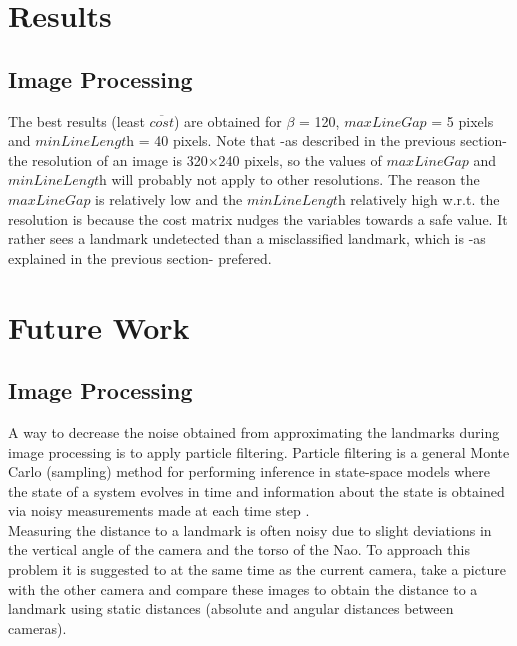 \documentclass{ba-kecs}
\numberwithin{figure}{section}
\numberwithin{equation}{section}
\begin{document}

\section{Results}

\subsection{Image Processing}
The best results (least $\overline{\textit{cost}}$) are obtained for $\beta$ = 120,  $\textit{maxLineGap}$ = 5 pixels and $\textit{minLineLength}$ = 40 pixels. Note that -as described in the previous section- the resolution of an image is 320$\times$240 pixels, so the values of $\textit{maxLineGap}$ and $\textit{minLineLength}$ will probably not apply to other resolutions.
The reason the $\textit{maxLineGap}$ is relatively low and the $\textit{minLineLength}$ relatively high w.r.t. the resolution is because the cost matrix nudges the variables towards a safe value. It rather sees a landmark undetected than a misclassified landmark, which is -as explained in the previous section- prefered.



\section{Future Work}

\subsection{Image Processing}
	A way to decrease the noise obtained from approximating the landmarks during image processing is to apply particle filtering. Particle filtering is a general Monte Carlo (sampling) method for performing inference in
state-space models where the state of a system evolves in time and information about the state is obtained via noisy measurements made at each time step \cite{ParFil}. \\

	Measuring the distance to a landmark is often noisy due to slight deviations in the vertical angle of the camera and the torso of the Nao. To approach this problem it is suggested to at the same time as the current camera, take a picture with the other camera and compare these images to obtain the distance to a landmark using static distances (absolute and angular distances between cameras).
\end{document}
